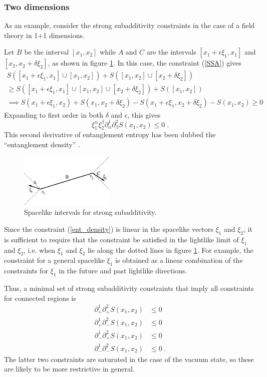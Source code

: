 \documentclass[12pt,epsf]{article}
\newcommand{\be}{\begin{equation}}
\newcommand{\ee}{\end{equation}}
\begin{document}
\subsubsection*{Two dimensions}

As an example, consider the strong subadditivity constraints in the case of a field theory in 1+1 dimensions.

Let $B$ be the interval $[x_1,x_2]$ while $A$ and $C$ are the intervals $[x_1+\epsilon \xi_1,x_1]$ and $[x_2,x_2 + \delta \xi_2]$, as shown in figure \ref{figSSA}. In this case, the constraint (\ref{SSA}) gives
\begin{multline*}
 S([x_1+\epsilon \xi_1,x_1] \cup [x_1,x_2]) + S([x_1,x_2] \cup [x_2 + \delta \xi_2]) \\ \ge S([x_1+\epsilon \xi_1,x_1] \cup [x_1,x_2] \cup [x_2 + \delta \xi_2]) + S([x_1,x_2]) \\
\implies S(x_1+\epsilon \xi_1,x_2) + S(x_1,x_2 + \delta \xi_2) - S(x_1+\epsilon \xi_1,x_2 + \delta \xi_2) - S(x_1,x_2) \ge 0
\end{multline*}
Expanding to first order in both $\delta$ and $\epsilon$, this gives
\be
\label{ent_density}
\xi_1^\alpha \xi_2^\beta \partial^1_\alpha \partial^2_\beta S(x_1,x_2) \le 0 \; .
\ee
This second derivative of entanglement entropy has been dubbed the ``entanglement density'' \cite{Bhattacharya:2014vja}.

\begin{figure}
\centering
\includegraphics[width=0.4\textwidth]{figSSA.eps}
\caption{Spacelike intervals for strong subadditivity.}
\label{figSSA}
\end{figure}

Since the constraint (\ref{ent_density}) is linear in the spacelike vectors $\xi_1$ and $\xi_2$, it is sufficient to require that the constraint be satisfied in the lightlike limit of $\xi_1$ and $\xi_2$, i.e. when  $\xi_1$ and $\xi_2$ lie along the dotted lines in figure \ref{figSSA}. For example, the constraint for a general spacelike $\xi_1$ is obtained as a linear combination of the constraints for $\xi_1$ in the future and past lightlike directions.

Thus, a minimal set of strong subadditivity constraints that imply all constraints for connected regions is
\begin{align}
\label{EDlightlike}
\partial^1_+ \partial^2_+ S(x_1,x_2) &\le 0 \nonumber \\
\partial^1_+ \partial^2_- S(x_1,x_2) &\le 0 \nonumber\\
\partial^1_- \partial^2_+ S(x_1,x_2) &\le 0 \nonumber\\
\partial^1_- \partial^2_- S(x_1,x_2) &\le 0\; .
\end{align}
The latter two constraints are saturated in the case of the vacuum state, so these are likely to be more restrictive in general.
\end{document}
